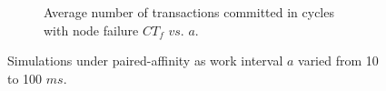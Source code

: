 \begin{figure}
\begin{subfigure}{.32\textwidth}
    \caption{Average number of transactions committed in cycles with node failure $CT_f$ $vs.$ $a$.}
    \label{fig:6c}
\end{subfigure}
\caption{Simulations under paired-affinity as work interval $a$ varied from 10 to 100 $ms$.}
\label{fig:6}
\end{figure}